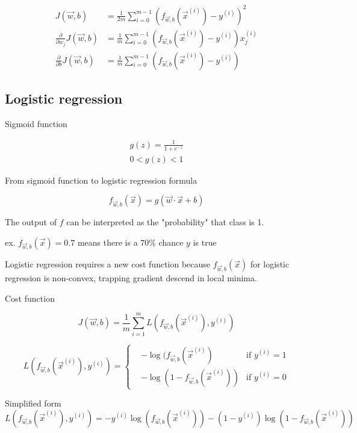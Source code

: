 \documentclass[12pt]{article}
\begin{document}
\begin{align*}
J(\vec{w},b) &= \frac{1}{2m} \sum_{i=0}^{m-1} (f_{\vec{w},b}(\vec{x}^{(i)}) - y^{(i)})^2\\
\frac{\partial}{\partial w_j} J(\vec{w},b) &= \frac{1}{m} \sum_{i=0}^{m-1} (f_{\vec{w},b}(\vec{x}^{(i)}) - y^{(i)}) x_j^{(i)}\\
\frac{\partial}{\partial b} J(\vec{w},b) &= \frac{1}{m} \sum_{i=0}^{m-1} (f_{\vec{w},b}(\vec{x}^{(i)}) - y^{(i)})
\end{align*}

\subsection{Logistic regression}

Sigmoid function

\begin{gather*}
g(z) = \frac{1}{1 + e^{-z}}\\
0 < g(z) < 1
\end{gather*}

From sigmoid function to logistic regression formula

\[ f_{\vec{w},b}(\vec{x}) = g(\vec{w} \cdot \vec{x} + b) \]

The output of $f$ can be interpreted as the "probability" that class is 1.

ex. $f_{\vec{w},b}(\vec{x}) = 0.7$ means there is a 70\% chance $y$ is true

Logistic regression requires a new cost function because $f_{\vec{w},b}(\vec{x})$ for logistic regression is non-convex, trapping gradient descend in local minima.

Cost function

\[ J(\vec{w},b) = \frac{1}{m} \sum_{i=1}^{m} L(f_{\vec{w},b}(\vec{x}^{(i)}),y^{(i)}) \]

\begin{equation*}
L(f_{\vec{w},b}(\vec{x}^{(i)}),y^{(i)}) = 
  \left\{
    \begin{aligned}
      & -\log(f_{\vec{w},b}(\vec{x}^{(i)}) & \text{if } y^{(i)} = 1 \\
      & -\log(1 - f_{\vec{w},b}(\vec{x}^{(i)})) & \text{if } y^{(i)} = 0
    \end{aligned}
  \right.
\end{equation*}

Simplified form
\[ L(f_{\vec{w},b}(\vec{x}^{(i)}), y^{(i)}) = -y^{(i)} \log(f_{\vec{w},b}(\vec{x}^{(i)})) - (1 - y^{(i)}) \log (1 - f_{\vec{w},b}(\vec{x}^{(i)})) \]
\end{document}
